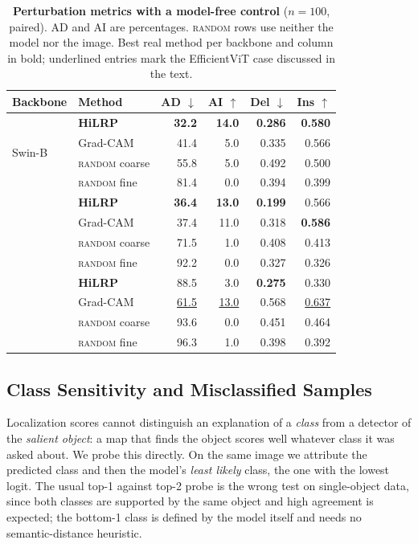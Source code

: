 \documentclass[lettersize,journal]{IEEEtran}
\theoremstyle{definition}
\theoremstyle{plain}
\newcommand{\best}[1]{\textbf{#1}}
\newcommand{\up}{$\uparrow$}
\newcommand{\down}{$\downarrow$}
\begin{document}
\begin{table}[!tbp]
  \centering
  \caption{\textbf{Perturbation metrics with a model-free control}
  ($n{=}100$, paired). AD and AI are percentages. \textsc{random} rows use
  neither the model nor the image. Best real method per backbone and column in
  bold; underlined entries mark the EfficientViT case discussed in the text.}
  \label{tab:adai}
  \setlength{\tabcolsep}{4pt}
  \footnotesize
  \begin{tabular}{@{}l l r r r r@{}}
    \toprule
    Backbone & Method & AD \down & AI \up & Del \down & Ins \up \\
    \midrule
    \multirow{4}{*}{Swin-B}
      & \textbf{HiLRP}  & \best{32.2} & \best{14.0} & \best{0.286} & \best{0.580} \\
      & Grad-CAM        & 41.4 & 5.0 & 0.335 & 0.566 \\
      & \textsc{random} coarse & 55.8 & 5.0 & 0.492 & 0.500 \\
      & \textsc{random} fine   & 81.4 & 0.0 & 0.394 & 0.399 \\
    \addlinespace
    \multirow{4}{*}{PVT-v2-b2}
      & \textbf{HiLRP}  & \best{36.4} & \best{13.0} & \best{0.199} & 0.566 \\
      & Grad-CAM        & 37.4 & 11.0 & 0.318 & \best{0.586} \\
      & \textsc{random} coarse & 71.5 & 1.0 & 0.408 & 0.413 \\
      & \textsc{random} fine   & 92.2 & 0.0 & 0.327 & 0.326 \\
    \addlinespace
    \multirow{4}{*}{EfficientViT-B2}
      & \textbf{HiLRP}  & 88.5 & 3.0 & \best{0.275} & 0.330 \\
      & Grad-CAM        & \underline{61.5} & \underline{13.0} & 0.568 & \underline{0.637} \\
      & \textsc{random} coarse & 93.6 & 0.0 & 0.451 & 0.464 \\
      & \textsc{random} fine   & 96.3 & 1.0 & 0.398 & 0.392 \\
    \bottomrule
  \end{tabular}
\end{table}

\subsection{Class Sensitivity and Misclassified Samples}
\label{sec:class-sensitivity}
Localization scores cannot distinguish an explanation of a \emph{class} from a
detector of the \emph{salient object}: a map that finds the object scores well
whatever class it was asked about. We probe this directly. On the same image we
attribute the predicted class and then the model's \emph{least likely} class,
the one with the lowest logit. The usual top-1 against top-2 probe is
the wrong test on single-object data, since both classes are supported by the
same object and high agreement is expected; the bottom-1 class is defined by the
model itself and needs no semantic-distance heuristic.
\end{document}

